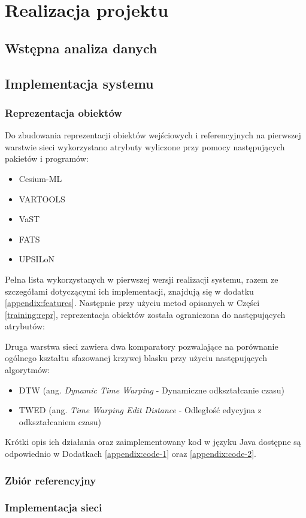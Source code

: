 \documentclass{pracalicmgr}
\begin{document}
	\section{Realizacja projektu}
	\subsection{Wstępna analiza danych}
	\subsection{Implementacja systemu}
    \subsubsection{Reprezentacja obiektów}
    Do zbudowania reprezentacji obiektów wejściowych i referencyjnych na pierwszej warstwie sieci wykorzystano atrybuty wyliczone przy pomocy następujących pakietów i programów:
    \begin{itemize}
        \item Cesium-ML %
        \item VARTOOLS %
        \item VaST %
        \item FATS %
        \item UPSILoN %
    \end{itemize}
    Pełna lista wykorzystanych w pierwszej wersji realizacji systemu, razem ze szczegółami dotyczącymi ich implementacji, znajdują się w dodatku \ref{appendix:features}. Następnie przy użyciu metod opisanych w Części \ref{training:repr}, reprezentacja obiektów została ograniczona do następujących atrybutów:
    
    
    Druga warstwa sieci zawiera dwa komparatory pozwalające na porównanie ogólnego kształtu sfazowanej krzywej blasku przy użyciu następujących algorytmów:
    \begin{itemize}
        \item DTW (ang. \textit{Dynamic Time Warping} - Dynamiczne odkształcanie czasu) 
        \item TWED (ang. \textit{Time Warping Edit Distance} - Odległość edycyjna z odkształcaniem czasu)
    \end{itemize} 
    Krótki opis ich działania oraz zaimplementowany kod w języku Java dostępne są odpowiednio w Dodatkach \ref{appendix:code-1} oraz \ref{appendix:code-2}.
    \subsubsection{Zbiór referencyjny}
    \subsubsection{Implementacja sieci}
    
\end{document}
